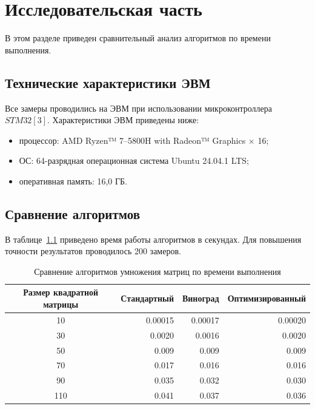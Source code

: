 \clearpage


\chapter{Исследовательская часть}\label{ch:-}
В этом разделе приведен сравнительный анализ алгоритмов по времени выполнения.


\section{Технические характеристики ЭВМ}\label{sec:--2}
Все замеры проводились на ЭВМ при использовании микроконтроллера $STM32{[3]}$. Характеристики ЭВМ приведены ниже:
\begin{itemize}
    \item процессор: AMD Ryzen™ 7--5800H with Radeon™ Graphics × 16;
    \item ОС: 64-разрядная операционная система Ubuntu 24.04.1 LTS;
    \item оперативная память: 16,0 ГБ.
\end{itemize}


\section{Сравнение алгоритмов}
В таблице~\ref{tbl:mult_time} приведено время работы алгоритмов в секундах.
Для повышения точности результатов проводилось 200 замеров.

\begin{table}[h]
	\begin{center}
	\caption{\label{tbl:mult_time} Сравнение алгоритмов умножения матриц по времени выполнения}
	\begin{tabular}{|c|r|r|r|}
		\hline
		Размер квадратной матрицы & Стандартный & Виноград & Оптимизированный
		\\ \hline
		10 & 0.00015 & 0.00017 & 0.00020
		\\ \hline
		30 & 0.0020 & 0.0016 & 0.0020
		\\ \hline
		50 & 0.009 & 0.009 & 0.009
		\\ \hline
		70 & 0.017 & 0.016 & 0.016
		\\ \hline
		90 & 0.035 & 0.032 & 0.030
		\\ \hline
		110 & 0.041 & 0.037 & 0.036
		\\ \hline
	\end{tabular}
	\end{center}
\end{table}

